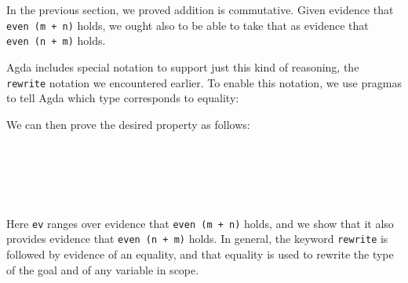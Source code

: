 In the previous section, we proved addition is commutative. Given
evidence that \texttt{even\ (m\ +\ n)} holds, we ought also to be able
to take that as evidence that \texttt{even\ (n\ +\ m)} holds.

Agda includes special notation to support just this kind of reasoning,
the \texttt{rewrite} notation we encountered earlier. To enable this
notation, we use pragmas to tell Agda which type corresponds to
equality:

\begin{fence}
\begin{code}%
\>[0]\AgdaSymbol{\{-\#}\AgdaSpace{}%
\AgdaSpace{}%
\AgdaSpace{}%
\AgdaSpace{}%
\AgdaSymbol{\#-\}}\<%
\end{code}
\end{fence}

We can then prove the desired property as follows:

\begin{fence}
\begin{code}%
\>[0]\AgdaSpace{}%
\AgdaSymbol{:}\AgdaSpace{}%
\AgdaSpace{}%
\AgdaSymbol{(}\AgdaSpace{}%
\AgdaSpace{}%
\AgdaSymbol{:}\AgdaSpace{}%
\AgdaSymbol{)}\<%
\\
\>[0][@{}l@{\AgdaIndent{0}}]%
\>[2]%
\>[426I]\AgdaSpace{}%
\AgdaSymbol{(}\AgdaSpace{}%
\AgdaOperator{\AgdaFunction{+}}\AgdaSpace{}%
\AgdaSymbol{)}\<%
\\
\>[.][@{}l@{}]\<[426I]%
\>[4]\AgdaComment{------------}\<%
\\
%
\>[2]\AgdaSpace{}%
\AgdaSpace{}%
\AgdaSymbol{(}\AgdaSpace{}%
\AgdaOperator{\AgdaFunction{+}}\AgdaSpace{}%
\AgdaSymbol{)}\<%
\\
\>[0]\AgdaSpace{}%
\AgdaSpace{}%
\AgdaSpace{}%
%
\>[18]\AgdaSpace{}%
\AgdaSpace{}%
\AgdaSpace{}%
%
\>[38]\AgdaSymbol{=}%
\>[41]\<%
\end{code}
\end{fence}

Here \texttt{ev} ranges over evidence that \texttt{even\ (m\ +\ n)}
holds, and we show that it also provides evidence that
\texttt{even\ (n\ +\ m)} holds. In general, the keyword \texttt{rewrite}
is followed by evidence of an equality, and that equality is used to
rewrite the type of the goal and of any variable in scope.

